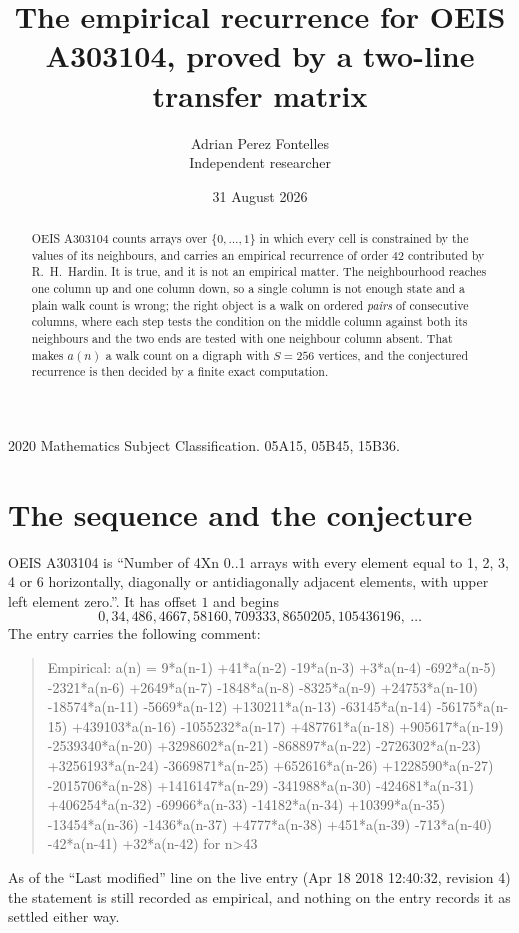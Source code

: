 \documentclass[11pt,a4paper]{article}
\title{The empirical recurrence for OEIS A303104, proved by a two-line transfer matrix}
\author{Adrian Perez Fontelles\\ \small Independent researcher}
\date{31 August 2026}
\theoremstyle{plain}
\theoremstyle{definition}
\begin{document}
\maketitle

\begin{abstract}
OEIS A303104 counts arrays over $\{0,\dots,1\}$ in which every cell is constrained by the
values of its neighbours, and carries an empirical recurrence of order $42$ contributed
by R.~H.~Hardin. It is true, and it is not an empirical matter. The neighbourhood reaches one
column up and one column down, so a single column is not enough state and a plain walk count
is wrong; the right object is a walk on ordered \emph{pairs} of consecutive columns, where
each step tests the condition on the middle column against both its neighbours and the two
ends are tested with one neighbour column absent. That makes $a(n)$ a walk count on a digraph
with $S=256$ vertices, and the conjectured recurrence is then decided by a finite exact
computation.
\end{abstract}

\noindent\small 2020 Mathematics Subject Classification. 05A15, 05B45, 15B36.\normalsize

\section{The sequence and the conjecture}

OEIS A303104 is ``Number of 4Xn 0..1 arrays with every element equal to 1, 2, 3, 4 or 6 horizontally, diagonally or antidiagonally adjacent elements, with upper left element zero.''. It has offset $1$ and begins
\[
0, 34, 486, 4667, 58160, 709333, 8650205, 105436196,\ \dots
\]
The entry carries the following comment:
\begin{quote}\small
Empirical: a(n) = 9*a(n-1) +41*a(n-2) -19*a(n-3) +3*a(n-4) -692*a(n-5) -2321*a(n-6) +2649*a(n-7) -1848*a(n-8) -8325*a(n-9) +24753*a(n-10) -18574*a(n-11) -5669*a(n-12) +130211*a(n-13) -63145*a(n-14) -56175*a(n-15) +439103*a(n-16) -1055232*a(n-17) +487761*a(n-18) +905617*a(n-19) -2539340*a(n-20) +3298602*a(n-21) -868897*a(n-22) -2726302*a(n-23) +3256193*a(n-24) -3669871*a(n-25) +652616*a(n-26) +1228590*a(n-27) -2015706*a(n-28) +1416147*a(n-29) -341988*a(n-30) -424681*a(n-31) +406254*a(n-32) -69966*a(n-33) -14182*a(n-34) +10399*a(n-35) -13454*a(n-36) -1436*a(n-37) +4777*a(n-38) +451*a(n-39) -713*a(n-40) -42*a(n-41) +32*a(n-42) for n>43
\end{quote}
As of the ``Last modified'' line on the live entry (Apr 18 2018 12:40:32, revision 4) the statement is
still recorded as empirical, and nothing on the entry records it as settled either way.
\end{document}
